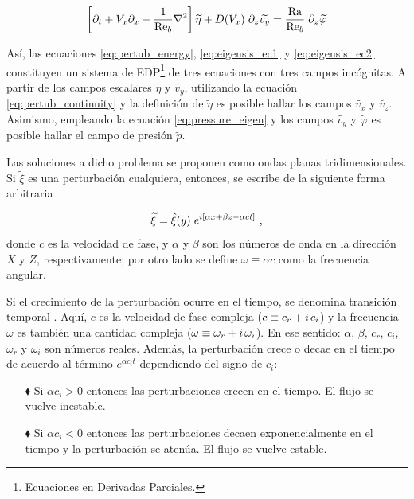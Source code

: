 \begin{equation}
 \left[ \partial_t + V_x \partial_x - \frac{1}{\text{Re}_b} \nabla^2  \right] \widetilde{\eta}  +  D(V_x) \hspace{1mm} \partial_z \widetilde{v_y} = \frac{\text{Ra}}{\text{Re}_b} \hspace{1mm} \partial_{z} \widetilde{\varphi}
\label{eq:eigensis_ec2}
\end{equation}

Así, las ecuaciones \ref{eq:pertub_energy}, \ref{eq:eigensis_ec1} y \ref{eq:eigensis_ec2} constituyen un sistema de EDP\footnote{Ecuaciones en Derivadas Parciales.} de tres ecuaciones con tres campos incógnitas. A partir de los campos escalares $\widetilde{\eta}$ y $\widetilde{v_y}$, utilizando la ecuación \ref{eq:pertub_continuity} y la definición de $\widetilde{\eta}$ es posible hallar los campos $\widetilde{v_x}$ y $\widetilde{v_z}$. Asimismo, empleando la ecuación \ref{eq:pressure_eigen} y los campos $\widetilde{v_y}$ y  $\widetilde{\varphi}$ es posible hallar el campo de presión  $\widetilde{p}$. 

Las soluciones a dicho problema se proponen como ondas planas tridimensionales. Si $\widetilde{\xi}$ es una perturbación cualquiera, entonces, se escribe de la siguiente forma arbitraria

\begin{equation}
\widetilde{\xi} = \hat{\xi}(y) \hspace{1mm} e^{i \left[ \alpha x + \beta z - \alpha c t \right]} \text{ ,}
\label{eq:waves3d}
\end{equation}
donde $c$  es la velocidad de fase, y $\alpha$ y $\beta$ son los números de onda en la dirección $X$ y $Z$, respectivamente; por otro lado se define $\omega \equiv \alpha c$ como la frecuencia angular. 

Si el crecimiento de la perturbación ocurre en el tiempo, se denomina transición temporal \cite{machaca2024}. Aquí, $c$ es la velocidad de fase compleja ($c \equiv c_r + i \hspace{0.5mm} c_i$) y la frecuencia $\omega$ es también una cantidad compleja ($\omega \equiv \omega_r + i \hspace{0.5mm} \omega_i$). En ese sentido: $\alpha$, $\beta$, $c_r$, $c_i$, $\omega_r$ y $\omega_i$ son números reales. Además, la perturbación crece o decae en el tiempo de acuerdo al término $e^{\alpha c_i t}$ dependiendo del signo de $c_i$: 

\begin{itemize}
\item[$\blacklozenge$] Si $\alpha c_i > 0$ entonces las perturbaciones crecen en el tiempo. El flujo se vuelve inestable.

\item[$\blacklozenge$] Si $\alpha c_i < 0$ entonces las perturbaciones decaen exponencialmente en el tiempo y la perturbación se atenúa. El flujo se vuelve estable.
\end{itemize}

